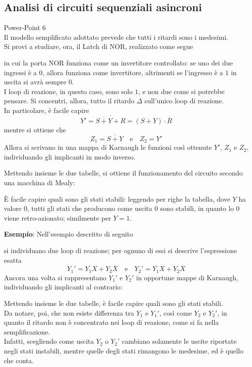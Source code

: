 \documentclass[a4paper]{extarticle}
\begin{document}
\vspace{1em}
\noindent
\subsection{Analisi di circuiti sequenziali asincroni}
Power-Point 6\\
Il modello semplificato adottato prevede che tutti i ritardi sono i medesimi.\\
Si provi a studiare, ora, il Latch di NOR, realizzato come segue


\vspace{1em}
\noindent
in cui la porta NOR funziona come un invertitore controllato: se uno dei due ingressi è a $0$, allora funziona come invertitore, altrimenti se l'ingresso è a $1$ in uscita si avrà sempre $0$.\\
I loop di reazione, in questo caso, sono solo $1$, e non due come si potrebbe pensare. Si concentri, allora, tutto il ritardo $\Delta$ sull'unico loop di reazione.\\
In particolare, è facile capire
\[Y'=\overline{\overline{S+Y}+R} = (S+Y) \cdot \overline{R}\]
mentre si ottiene che
\[Z_1=\overline{S+Y} \hspace{1em} \text{e} \hspace{1em} Z_2=Y'\]
Allora si scrivano in una mappa di Karnaugh le funzioni così ottenute $Y'$, $Z_1$ e $Z_2$, individuando gli implicanti in modo inverso.

\vspace{1em}
\noindent
Mettendo insieme le due tabelle, si ottiene il funzionamento del circuito secondo una macchina di Mealy:

\vspace{1em}
\noindent
È facile capire quali sono gli stati stabili: leggendo per righe la tabella, dove $Y$ ha valore $0$, tutti gli stati che producono come uscita $0$ sono stabili, in quanto lo $0$ viene retro-azionato; similmente per $Y=1$.

\vspace{2em}
\noindent
\textbf{Esempio}: Nell'esempio descritto di seguito

\vspace{1em}
\noindent
si individuano due loop di reazione; per ognuno di essi si descrive l'espressione esatta
\[Y_1'=Y_1X + Y_2 \overline{X} \hspace{1em} \text{e} \hspace{1em} Y_2'=\overline{Y_1}X + Y_2 \overline{X}\]
Ancora una volta si rappresentano $Y_1'$ e $Y_2'$ in opportune mappe di Karnaugh, individuando gli implicanti al contrario:

\vspace{1em}
\noindent
Mettendo insieme le due tabelle, è facile capire quali sono gli stati stabili.\\
Da notare, poi, che non esiste differenza tra $Y_1$ e $Y_1'$, così come $Y_2$ e $Y_2'$, in quanto il ritardo non è concentrato nei loop di reazione, come si fa nella semplificazione.\\
Infatti, scegliendo come uscita $Y_2$ o $Y_2'$ cambiano solamente le uscite riportate negli stati instabili, mentre quelle degli stati rimangono le medesime, ed è quello che conta.
\end{document}
